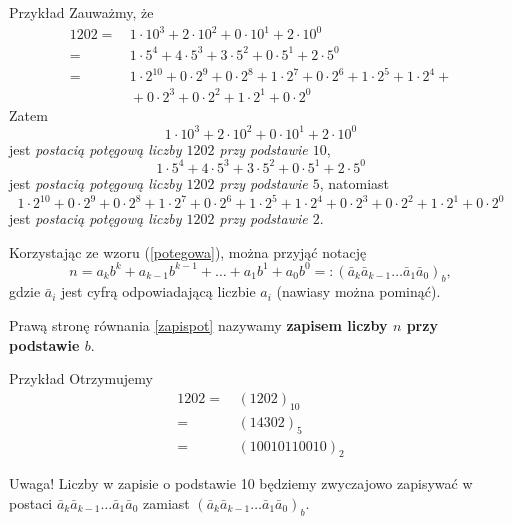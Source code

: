 \documentclass[a4paper,10pt]{beamer}
\begin{document}
\begin{frame}

\begin{exampleblock}{Przykład}
Zauważmy, że
\begin{align*}1202=&\,1\cdot10^3+2\cdot10^2+0\cdot10^1+2\cdot10^0\\
=&\,1\cdot5^4+4\cdot5^3+3\cdot5^2+0\cdot5^1+2\cdot5^0\\
=&\,1\cdot2^{10}+0\cdot2^9+0\cdot2^8+1\cdot2^7+0\cdot2^6+1\cdot2^5+1\cdot2^4+\\
&\,+0\cdot2^3+0\cdot2^2+1\cdot2^1+0\cdot2^0
\end{align*}
Zatem $$1\cdot10^3+2\cdot10^2+0\cdot10^1+2\cdot10^0$$
jest {\it postacią potęgową liczby $1202$ przy podstawie $10$},
$$1\cdot5^4+4\cdot5^3+3\cdot5^2+0\cdot5^1+2\cdot5^0$$
jest {\it postacią potęgową liczby $1202$ przy podstawie $5$}, natomiast
$$1\cdot2^{10}+0\cdot2^9+0\cdot2^8+1\cdot2^7+0\cdot2^6+1\cdot2^5+1\cdot2^4+0\cdot2^3+0\cdot2^2+1\cdot2^1+0\cdot2^0$$
jest {\it postacią potęgową liczby $1202$ przy podstawie $2$}.
\end{exampleblock}


\end{frame}


\begin{frame}
	Korzystając ze wzoru (\ref{potegowa}), można przyjąć notację 
	\begin{equation}\label{zapispot}
		n=a_kb^k+a_{k-1}b^{k-1}+\ldots+a_1b^1+a_0b^0=:\left(\bar{a}_k\bar{a}_{k-1}\ldots\bar{a}_1\bar{a}_0\right)_b,
	\end{equation}
	gdzie $\bar{a}_i$ jest cyfrą odpowiadającą liczbie $a_i$ (nawiasy można pominąć).
	
	Prawą stronę równania \eqref{zapispot} nazywamy {\bf zapisem liczby $n$ przy podstawie $b$}.
	
	
	\begin{exampleblock}{Przykład}
Otrzymujemy\begin{align*}1202=&\,(1202)_{10}\\
=&\,(14302)_5\\
=&\,(10010110010)_2
\end{align*}
\end{exampleblock}
	
	

	\begin{alertblock}{Uwaga!}
		Liczby w zapisie o podstawie 10 będziemy zwyczajowo zapisywać w postaci $\bar{a}_k\bar{a}_{k-1}\ldots\bar{a}_1\bar{a}_0$ zamiast $\left(\bar{a}_k\bar{a}_{k-1}\ldots\bar{a}_1\bar{a}_0\right)_b$.
	\end{alertblock}
\end{frame}
\end{document}
